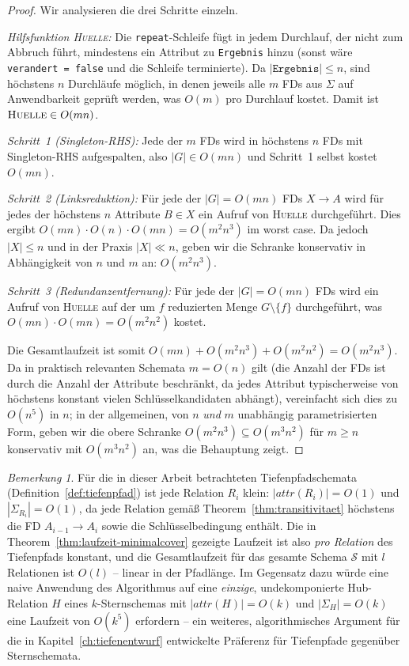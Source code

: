 ﻿\documentclass[a4paper,12pt]{report}
\theoremstyle{definition}
\theoremstyle{remark}
\newtheorem{remark}{Bemerkung}[chapter]
\newcommand{\att}{\mathit{attr}}
\begin{document}
\begin{proof}
Wir analysieren die drei Schritte einzeln.

\emph{Hilfsfunktion \textsc{Huelle}:} Die \texttt{repeat}-Schleife
fügt in jedem Durchlauf, der nicht zum Abbruch führt, mindestens ein
Attribut zu \texttt{Ergebnis} hinzu (sonst wäre \texttt{verandert =
false} und die Schleife terminierte). Da $|\texttt{Ergebnis}|\leq n$,
sind höchstens $n$ Durchläufe möglich, in denen jeweils alle $m$ FDs
aus $\Sigma$ auf Anwendbarkeit geprüft werden, was $O(m)$ pro
Durchlauf kostet. Damit ist $\textsc{Huelle}\in O(mn)$.

\emph{Schritt~1 (Singleton-RHS):} Jede der $m$ FDs wird in höchstens
$n$ FDs mit Singleton-RHS aufgespalten, also $|G|\in O(mn)$ und
Schritt~1 selbst kostet $O(mn)$.

\emph{Schritt~2 (Linksreduktion):} Für jede der $|G|=O(mn)$ FDs $X\to
A$ wird für jedes der höchstens $n$ Attribute $B\in X$ ein Aufruf von
\textsc{Huelle} durchgeführt. Dies ergibt
$O(mn)\cdot O(n)\cdot O(mn)=O(m^2n^3)$ im worst case. Da jedoch $|X|\leq
n$ und in der Praxis $|X|\ll n$, geben wir die Schranke konservativ in
Abhängigkeit von $n$ und $m$ an: $O(m^2 n^3)$.

\emph{Schritt~3 (Redundanzentfernung):} Für jede der $|G|=O(mn)$ FDs
wird ein Aufruf von \textsc{Huelle} auf der um $f$ reduzierten Menge
$G\setminus\{f\}$ durchgeführt, was $O(mn)\cdot O(mn)=O(m^2n^2)$
kostet.

Die Gesamtlaufzeit ist somit
$O(mn)+O(m^2n^3)+O(m^2n^2)=O(m^2n^3)$.
Da in praktisch relevanten Schemata $m=O(n)$ gilt (die Anzahl der FDs
ist durch die Anzahl der Attribute beschränkt, da jedes Attribut
typischerweise von höchstens konstant vielen Schlüsselkandidaten
abhängt), vereinfacht sich dies zu $O(n^5)$ in $n$; in der allgemeinen,
von $n$ \emph{und} $m$ unabhängig parametrisierten Form, geben wir die
obere Schranke $O(m^2 n^3) \subseteq O(m^3 n^2)$ für $m\geq n$ konservativ
mit $O(m^3n^2)$ an, was die Behauptung zeigt. \qedhere
\end{proof}

\begin{remark}
Für die in dieser Arbeit betrachteten Tiefenpfadschemata
(Definition~\ref{def:tiefenpfad}) ist jede Relation $R_i$ klein:
$|\att(R_i)|=O(1)$ und $|\Sigma_{R_i}|=O(1)$, da jede Relation gemäß
Theorem~\ref{thm:transitivitaet} höchstens die FD
$A_{i-1}\to A_i$ sowie die Schlüsselbedingung enthält. Die in
Theorem~\ref{thm:laufzeit-minimalcover} gezeigte Laufzeit ist also
\emph{pro Relation} des Tiefenpfads konstant, und die
Gesamtlaufzeit für das gesamte Schema $\mathcal{S}$ mit $l$ Relationen
ist $O(l)$ -- linear in der Pfadlänge. Im Gegensatz dazu würde eine
naive Anwendung des Algorithmus auf eine \emph{einzige}, undekomponierte
Hub-Relation $H$ eines $k$-Sternschemas mit $|\att(H)|=O(k)$ und
$|\Sigma_H|=O(k)$ eine Laufzeit von $O(k^5)$ erfordern -- ein weiteres,
algorithmisches Argument für die in Kapitel~\ref{ch:tiefenentwurf}
entwickelte Präferenz für Tiefenpfade gegenüber Sternschemata.
\end{remark}
\end{document}
